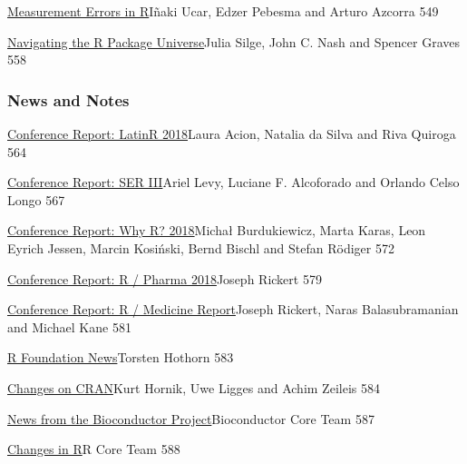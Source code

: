 \href{../../articles/RJ-2018-075}{Measurement Errors in R}Iñaki Ucar,
Edzer Pebesma and Arturo Azcorra 549

\href{../../articles/RJ-2018-058}{Navigating the R Package
Universe}Julia Silge, John C. Nash and Spencer Graves 558

\hypertarget{news-and-notes}{%
\subsubsection{News and Notes}\label{news-and-notes}}

\href{../../news/RJ-2018-2-latinR}{Conference Report: LatinR 2018}Laura
Acion, Natalia da Silva and Riva Quiroga 564

\href{../../news/RJ-2018-2-serIII}{Conference Report: SER III}Ariel
Levy, Luciane F. Alcoforado and Orlando Celso Longo 567

\href{../../news/RJ-2018-2-whyR}{Conference Report: Why R? 2018}Michał
Burdukiewicz, Marta Karas, Leon Eyrich Jessen, Marcin Kosiński, Bernd
Bischl and Stefan Rödiger 572

\href{../../news/RJ-2018-2-R_Pharma}{Conference Report: R / Pharma
2018}Joseph Rickert 579

\href{../../news/RJ-2018-2-R_Medicine}{Conference Report: R / Medicine
Report}Joseph Rickert, Naras Balasubramanian and Michael Kane 581

\href{../../news/RJ-2018-2-foundation}{R Foundation News}Torsten Hothorn
583

\href{../../news/RJ-2018-2-cran}{Changes on CRAN}Kurt Hornik, Uwe Ligges
and Achim Zeileis 584

\href{../../news/RJ-2018-2-bioc}{News from the Bioconductor
Project}Bioconductor Core Team 587

\href{../../news/RJ-2018-2-ch}{Changes in R}R Core Team 588

